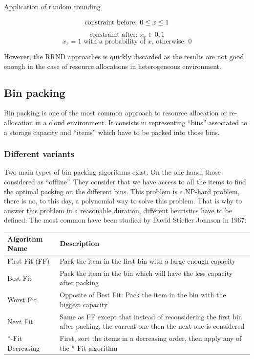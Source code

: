 \documentclass[a4paper,11pt]{article}
\begin{document}
\begin{figequation}
	\caption{Application of random rounding}
	\[
		\text{constraint before: } 0 \leq x \leq 1 \\
	\]
	\[
		\text{constraint after: } x_r \in {0, 1}
	\]
	\[
		x_r = 1 \text{ with a probability of $x$, otherwise: $0$}
	\]
\end{figequation}

However, the RRND approaches is quickly discarded as the results are not good
enough in the case of resource allocations in heterogeneous environment.

\subsection{Bin packing}

Bin packing is one of the most common approach to resource allocation or
re-allocation in a cloud environment. It consists in representing “bins”
associated to a storage capacity and “items” which have to be packed into
those bins.

\subsubsection{Different variants}

Two main types of bin packing algorithms exist. On the one hand, those
considered as “offline”. They consider that we have access to all the items to
find the optimal packing on the different bins. This problem is a NP-hard
problem, there is no, to this day, a polynomial way to solve this problem.
That is why to answer this problem in a reasonable duration, different
heuristics have to be defined. The most common have been studied by David
Stiefler Johnson in 1967\cite{maths:bpheuristics}:

\vspace{1em}
\begin{center}
	\begin{tabular}{| l | p{7cm} |}
		\hline
		Algorithm Name & Description \\
		\hline
		First Fit (FF) & Pack the item in the first bin with a large enough capacity \\
		\hline
		Best Fit & Pack the item in the bin which will have the less capacity after packing \\
		\hline
		Worst Fit & Opposite of Best Fit: Pack the item in the bin with the biggest capacity \\
		\hline
		Next Fit & Same as FF except that instead of reconsidering the first bin after packing, the current one then the next one is considered \\
		\hline
		*-Fit Decreasing & First, sort the items in a decreasing order, then apply any of the *-Fit algorithm \\
		\hline
	\end{tabular}
\end{center}
\vspace{1em}
\end{document}
